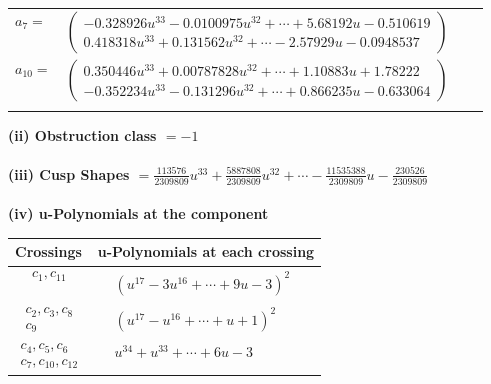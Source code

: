 \documentclass[1p]{elsarticle_modified}
\theoremstyle{definition}
\begin{document}
\begin{tabular}{m{7pt} m{180pt} m{7pt} m{180pt} }
\flushright $a_{7}=$&$\begin{pmatrix}-0.328926 u^{33}-0.0100975 u^{32}+\cdots+5.68192 u-0.510619\\0.418318 u^{33}+0.131562 u^{32}+\cdots-2.57929 u-0.0948537\end{pmatrix}$ \\
\flushright $a_{10}=$&$\begin{pmatrix}0.350446 u^{33}+0.00787828 u^{32}+\cdots+1.10883 u+1.78222\\-0.352234 u^{33}-0.131296 u^{32}+\cdots+0.866235 u-0.633064\end{pmatrix}$\\&\end{tabular}
\flushleft \textbf{(ii) Obstruction class $= -1$}\\~\\
\flushleft \textbf{(iii) Cusp Shapes $= \frac{113576}{2309809} u^{33}+\frac{5887808}{2309809} u^{32}+\cdots-\frac{11535388}{2309809} u-\frac{230526}{2309809}$}\\~\\
\newpage\renewcommand{\arraystretch}{1}
\flushleft \textbf{(iv) u-Polynomials at the component}\newline \\
\begin{tabular}{m{50pt}|m{274pt}}
Crossings & \hspace{64pt}u-Polynomials at each crossing \\
\hline $$\begin{aligned}c_{1},c_{11}\end{aligned}$$&$\begin{aligned}
&(u^{17}-3 u^{16}+\cdots+9 u-3)^{2}
\end{aligned}$\\
\hline $$\begin{aligned}c_{2},c_{3},c_{8}\\c_{9}\end{aligned}$$&$\begin{aligned}
&(u^{17}- u^{16}+\cdots+u+1)^{2}
\end{aligned}$\\
\hline $$\begin{aligned}c_{4},c_{5},c_{6}\\c_{7},c_{10},c_{12}\end{aligned}$$&$\begin{aligned}
&u^{34}+u^{33}+\cdots+6 u-3
\end{aligned}$\\
\hline
\end{tabular}\\~\\
\end{document}
